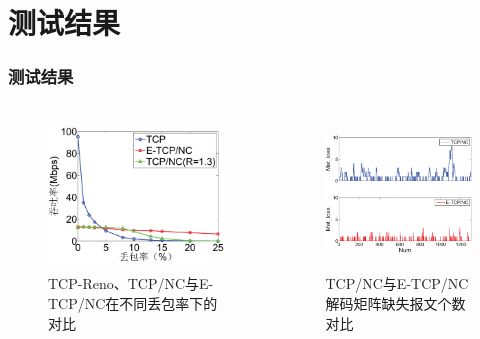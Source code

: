 \section{测试结果}
\begin{frame}[allowframebreaks]
	\frametitle{测试结果}
	\begin{columns}
		\begin{column}{0.5\textwidth}
			\begin{figure}
			\includegraphics[height=4cm]{../figures/adaptive_redundancy.eps}
			\caption{TCP-Reno、TCP/NC与E-TCP/NC在不同丢包率下的对比}
			\label{fig:adap_redun}
		\end{figure}
		\end{column}
		\begin{column}{0.5\textwidth}
			\begin{figure}
				
			
			\includegraphics[height=4cm]{../figures/buchang.eps}
			\caption{TCP/NC与E-TCP/NC解码矩阵缺失报文个数对比}
			\label{fig:queshigeshu}
		\end{figure}
		\end{column}
	\end{columns}
	\newpage
\end{frame}

